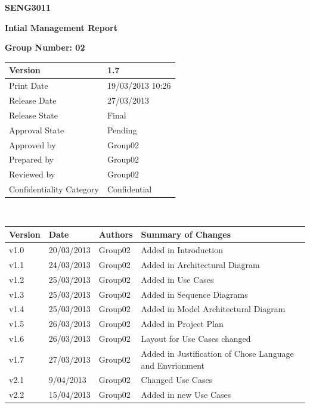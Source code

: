 \documentclass[a4paper]{article}
\begin{document}
\thispagestyle{empty}
\begin {center}
\Large\textbf{SENG3011} 

\Large\textbf{Intial Management Report}

\bigskip\Large\textbf{Group Number: 02}

\end{center}

\vspace*{16.5cm}
\begin{tabular}{|l|l|}
  \hline
  Version         & 1.7\\\hline
  Print Date      & 19/03/2013 10:26\\\hline
  Release Date    & 27/03/2013\\\hline
  Release State   & Final \\\hline
  Approval State  & Pending \\\hline
  Approved by     & Group02 \\\hline
  Prepared by     & Group02 \\\hline
  Reviewed by     & Group02 \\\hline
  Confidentiality Category  & Confidential\\\hline
\end{tabular}
\pagebreak



\thispagestyle{plain}     %
\setcounter{page}{1}      %
\renewcommand{\thepage}{\roman{page}}  %

\\[2ex]
\begin{tabular}{|l|l|l|l|}
  \hline
  Version & Date & Authors & Summary of Changes\\\hline\hline
	v1.0 & 20/03/2013 & Group02 & Added in Introduction           	\\\hline
	v1.1 & 24/03/2013 & Group02 & Added in Architectural Diagram 		\\\hline
	v1.2 & 25/03/2013 & Group02 & Added in Use Cases  		\\\hline
	v1.3 & 25/03/2013 & Group02 & Added in Sequence Diagrams		\\\hline
	v1.4 & 25/03/2013 & Group02 & Added in Model Architectural Diagram 		\\\hline
	v1.5 & 26/03/2013 & Group02 & Added in Project Plan		\\\hline
	v1.6 & 26/03/2013 & Group02 & Layout for Use Cases changed 		\\\hline
	v1.7 & 27/03/2013 & Group02 & Added in Justification of Chose Language and Envrionment 		\\\hline
	v2.1 & 9/04/2013 & Group02 & Changed Use Cases 		\\\hline
	v2.2 & 15/04/2013 & Group02 & Added in new Use Cases		\\\hline
\end{tabular}
\end{document}
